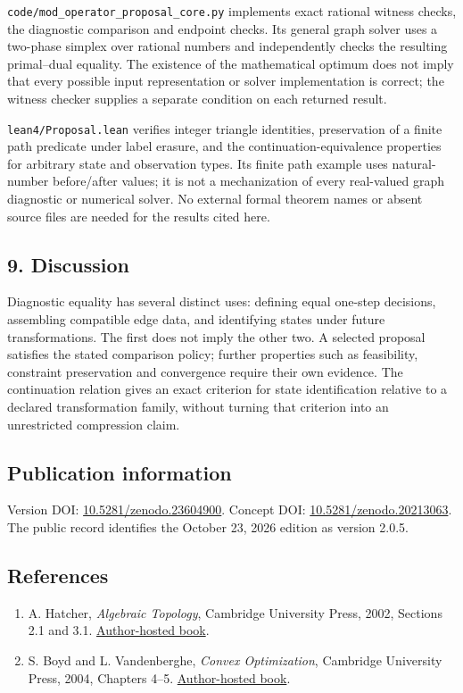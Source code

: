 \documentclass[
]{article}
\providecommand{\tightlist}{%
  \setlength{\itemsep}{0pt}\setlength{\parskip}{0pt}}
\begin{document}
\nolinkurl{code/mod_operator_proposal_core.py} implements exact rational
witness checks, the diagnostic comparison and endpoint checks. Its
general graph solver uses a two-phase simplex over rational numbers and
independently checks the resulting primal--dual equality. The existence
of the mathematical optimum does not imply that every possible input
representation or solver implementation is correct; the witness checker
supplies a separate condition on each returned result.

\nolinkurl{lean4/Proposal.lean} verifies integer triangle identities,
preservation of a finite path predicate under label erasure, and the
continuation-equivalence properties for arbitrary state and observation
types. Its finite path example uses natural-number before/after values;
it is not a mechanization of every real-valued graph diagnostic or
numerical solver. No external formal theorem names or absent source
files are needed for the results cited here.

\subsection{9. Discussion}\label{discussion}

Diagnostic equality has several distinct uses: defining equal one-step
decisions, assembling compatible edge data, and identifying states under
future transformations. The first does not imply the other two. A
selected proposal satisfies the stated comparison policy; further
properties such as feasibility, constraint preservation and convergence
require their own evidence. The continuation relation gives an exact
criterion for state identification relative to a declared transformation
family, without turning that criterion into an unrestricted compression
claim.

\subsection{Publication information}\label{publication-information}

Version DOI:
\href{https://doi.org/10.5281/zenodo.23604900}{10.5281/zenodo.23604900}.
Concept DOI:
\href{https://doi.org/10.5281/zenodo.20213063}{10.5281/zenodo.20213063}.
The public record identifies the October 23, 2026 edition as version
2.0.5.

\subsection{References}\label{references}

\begin{enumerate}
\def\labelenumi{\arabic{enumi}.}
\tightlist
\item
  A. Hatcher, \emph{Algebraic Topology}, Cambridge University Press,
  2002, Sections 2.1 and 3.1.
  \href{https://pi.math.cornell.edu/~hatcher/AT/ATpage.html}{Author-hosted
  book}.
\item
  S. Boyd and L. Vandenberghe, \emph{Convex Optimization}, Cambridge
  University Press, 2004, Chapters 4--5.
  \href{https://web.stanford.edu/~boyd/cvxbook/}{Author-hosted book}.
\end{enumerate}
\end{document}
